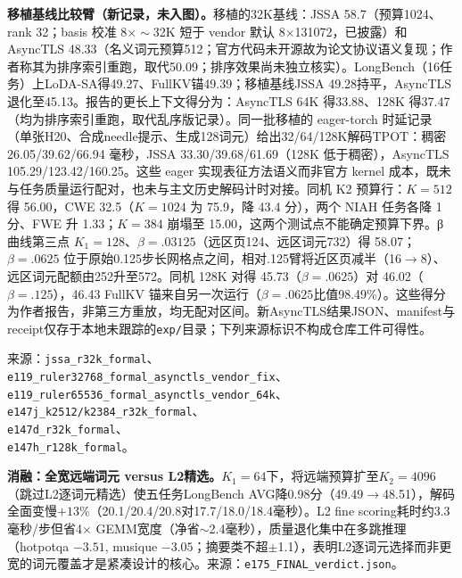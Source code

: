 \documentclass[10pt,letterpaper]{article}
\begin{document}
\par\medskip\noindent\textbf{移植基线比较臂（新记录，未入图）。}移植的32K基线：JSSA 58.7（预算1024、rank 32；basis 校准 8$\times\sim$32K 短于 vendor 默认 8$\times$131072，已披露）和 AsyncTLS 48.33（名义词元预算512；官方代码未开源故为论文协议语义复现；作者称其为排序索引重跑，取代50.09；排序效果尚未独立核实）。LongBench（16任务）上LoDA-SA得49.27、FullKV锚49.39；移植基线JSSA 49.28持平，AsyncTLS退化至45.13。报告的更长上下文得分为：AsyncTLS 64K 得33.88、128K 得37.47（均为排序索引重跑，取代乱序版记录）。同一批移植的 eager-torch 时延记录（单张H20、合成needle提示、生成128词元）给出32/64/128K解码TPOT：稠密 26.05/39.62/66.94 毫秒，JSSA 33.30/39.68/61.69（128K 低于稠密），AsyncTLS 105.29/123.42/160.25。这些 eager 实现表征方法语义而非官方 kernel 成本，既未与任务质量运行配对，也未与主文历史解码计时对接。同机 K2 预算行：$K=512$ 得 56.00，CWE 32.5（$K=1024$ 为 75.9，降 43.4 分），两个 NIAH 任务各降 1 分、FWE 升 1.33；$K=384$ 崩塌至 15.00，这两个测试点不能确定预算下界。β 曲线第三点 $K_1=128$、$\beta=.03125$（远区页124、远区词元732）得 58.07；$\beta=.0625$ 位于原始0.125步长网格点之间，相对.125臂将近区页减半（16$\rightarrow$8）、远区词元配额由252升至572。同机 128K 对得 45.73（$\beta=.0625$）对 46.02（$\beta=.125$），46.43 FullKV 锚来自另一次运行（$\beta=.0625$比值98.49\%）。这些得分为作者报告，非第三方重放，均无配对区间。新AsyncTLS结果JSON、manifest与receipt仅存于本地未跟踪的\texttt{exp/}目录；下列来源标识不构成仓库工件可得性。\par\noindent 来源：\texttt{jssa\_\allowbreak r32k\_\allowbreak formal}、\\\texttt{e119\_\allowbreak ruler32768\_\allowbreak formal\_\allowbreak asynctls\_\allowbreak vendor\_\allowbreak fix}、\\\texttt{e119\_\allowbreak ruler65536\_\allowbreak formal\_\allowbreak asynctls\_\allowbreak vendor\_\allowbreak 64k}、\\\texttt{e147j\_\allowbreak k2512/\allowbreak k2384\_\allowbreak r32k\_\allowbreak formal}、\\\texttt{e147d\_\allowbreak r32k\_\allowbreak formal}、\\\texttt{e147h\_\allowbreak r128k\_\allowbreak formal}。

\textbf{消融：全宽远端词元 versus L2精选。}$K_1{=}64$下，将远端预算扩至$K_2{=}4096$（跳过L2逐词元精选）使五任务LongBench AVG降0.98分（49.49$\rightarrow$48.51），解码全面变慢$+13\%$（20.1/20.4/20.8对17.7/18.0/18.4毫秒）。L2 fine scoring耗时约3.3毫秒/$步$但省4$\times$ GEMM宽度（净省$\sim$2.4毫秒），质量退化集中在多跳推理（hotpotqa $-3.51$, musique $-3.05$；摘要类不超$\pm$1.1），表明L2逐词元选择而非更宽的词元覆盖才是紧凑设计的核心。来源：\texttt{e175\_FINAL\_verdict.json}。
\end{document}
